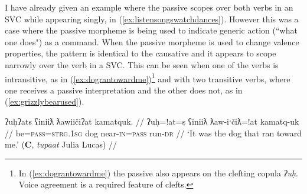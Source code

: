 \begin{comment}


\ex \label{ex:headonback}
\begingl
\glpreamble ʔuc̓aʔap̓at t̓uḥc̓iti hił ʔapw̓inʔatʔi. //
\gla ʔucaap=!at t̓uḥc̓iti hił ʔapw̓in=!at=ʔiˑ //
\glb make.go=\textsc{pass} head be.at shoulder=\textsc{poss.inalien}=\textsc{art} //
\glft `He put his head on his shoulder.' (\textbf{C}, \textit{tupaat} Julia Lucas) //
\endgl
\xe

\ex~ \label{ex:makesitdown}
\begingl
\glpreamble ʔaḥʔaaʔaƛʔał t̓iqʷaasʔap̓aƛʔał ḥaakʷaaƛʔi Monica. //
\gla ʔaḥʔaaʔaƛ=ʔał t̓iqʷ-aas=!ap=!aƛ=ʔał ḥaakʷaaƛ=ʔiˑ Monica //
\glb and.then=\textsc{pl} be.at=\textsc{caus} sit-horizontal.surface=\textsc{caus}=\textsc{now}=\textsc{pl} young.woman=\textsc{art} Monica //
\glft `And then they made the young girl Monica sit on a chair.' (\textbf{C}, \textit{tupaat} Julia Lucas) //
\endgl
\xe
\end{comment}

I have already given an example where the passive scopes over both verbs in an SVC while appearing singly, in (\ref{ex:listensongswatchdances}). However this was a case where the passive morpheme is being used to indicate generic action (``what one does") as a command. When the passive morpheme is used to change valence properties, the pattern is identical to the causative and it appears to scope narrowly over the verb in a SVC. This can be seen when one of the verbs is intransitive, as in (\ref{ex:dograntowardme})\footnote{In (\ref{ex:dograntowardme}) the passive also appears on the clefting copula \textit{ʔuḥ}. Voice agreement is a required feature of clefts.} and with two transitive verbs, where one receives a passive interpretation and the other does not, as in (\ref{ex:grizzlybearused}).

\ex \label{ex:dograntowardme}
\begingl
\glpreamble ʔuḥʔats ʕiniiƛ ƛawiičiʔat kamatquk. //
\gla ʔuḥ=!at=s ʕiniiƛ ƛaw-iˑčiƛ=!at kamatq-uk //
\glb be=\textsc{pass}=\textsc{strg.1sg} dog near-\textsc{in}=\textsc{pass} run-\textsc{dr} //
\glft `It was the dog that ran toward me.' (\textbf{C}, \textit{tupaat} Julia Lucas) //
\endgl
\xe

